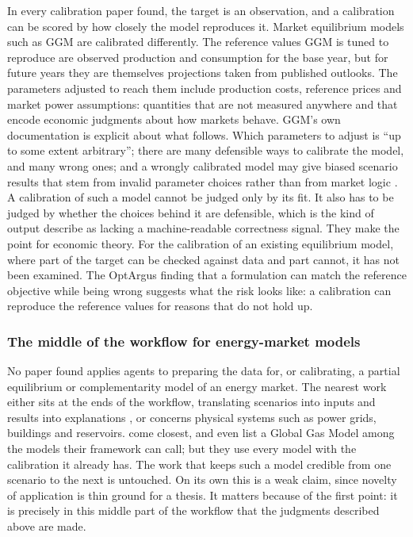 In every calibration paper found, the target is an observation, and a calibration can be scored by how closely the model reproduces it.
Market equilibrium models such as GGM are calibrated differently.
The reference values GGM is tuned to reproduce are observed production and consumption for the base year, but for future years they are themselves projections taken from published outlooks.
The parameters adjusted to reach them include production costs, reference prices and market power assumptions: quantities that are not measured anywhere and that encode economic judgments about how markets behave.
GGM's own documentation is explicit about what follows.
Which parameters to adjust is ``up to some extent arbitrary''; there are many defensible ways to calibrate the model, and many wrong ones; and a wrongly calibrated model may give biased scenario results that stem from invalid parameter choices rather than from market logic \citep[p.~26]{egging2019global}.
A calibration of such a model cannot be judged only by its fit.
It also has to be judged by whether the choices behind it are defensible, which is the kind of output \citet{zhu2026pai} describe as lacking a machine-readable correctness signal.
They make the point for economic theory.
For the calibration of an existing equilibrium model, where part of the target can be checked against data and part cannot, it has not been examined.
The OptArgus finding that a formulation can match the reference objective while being wrong \citep{li2026optargus} suggests what the risk looks like: a calibration can reproduce the reference values for reasons that do not hold up.


\subsubsection{The middle of the workflow for energy-market models}

No paper found applies agents to preparing the data for, or calibrating, a partial equilibrium or complementarity model of an energy market.
The nearest work either sits at the ends of the workflow, translating scenarios into inputs and results into explanations \citep{golden2026agentic, forootani2025re}, or concerns physical systems such as power grids, buildings and reservoirs.
\citet{golden2026agentic} come closest, and even list a Global Gas Model among the models their framework can call; but they use every model with the calibration it already has.
The work that keeps such a model credible from one scenario to the next is untouched.
On its own this is a weak claim, since novelty of application is thin ground for a thesis.
It matters because of the first point: it is precisely in this middle part of the workflow that the judgments described above are made.

